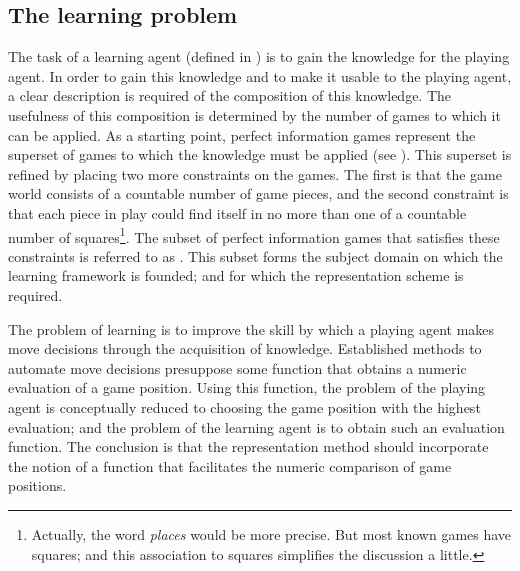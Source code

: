 \subsection*{The learning problem}
The task of a learning agent (defined in ) is to gain the knowledge for the playing agent. In order to gain this knowledge and to make it usable to the playing agent, a clear description is required of the composition of this knowledge.  The usefulness of this composition is determined by the number of games to which it can be applied. As a starting point, perfect information games represent the superset of games to which the knowledge must be applied (see ). This superset is refined by placing two more constraints on the games. The first is that the game world consists of a countable number of game pieces, and the second constraint is that each piece in play could find itself in no more than one of a countable number of squares\footnote{Actually, the word {\it places} would be more precise.  But most known games have squares; and this association to squares simplifies the discussion a little.}.  The subset of perfect information games that satisfies these constraints is referred to as .  This subset forms the  subject domain on which the learning framework is founded; and for which the representation scheme is required.          

The problem of learning is to improve the skill by which a playing agent makes move decisions through the acquisition of knowledge.  Established methods to automate move decisions presuppose some function that obtains a numeric evaluation of a game position.  Using this function, the problem of the playing agent is conceptually reduced to choosing the game position with the highest evaluation; and the problem of the learning agent is to obtain such an evaluation function.  The conclusion is that the representation method should incorporate the notion of a function that facilitates the numeric comparison of game positions.  

